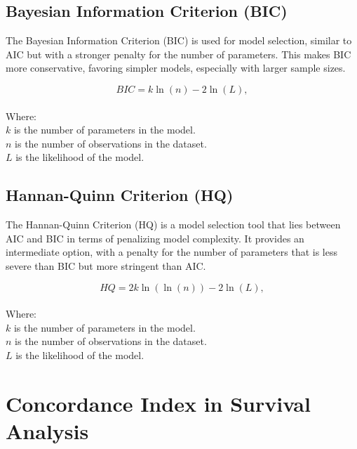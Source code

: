 \documentclass[doublespacing,12pt]{report}
\begin{document}
\subsection{Bayesian Information Criterion (BIC)}
The Bayesian Information Criterion (BIC) is used for model selection, similar to AIC but with a stronger penalty for the number of parameters. This makes BIC more conservative, favoring simpler models, especially with larger sample sizes.

\begin{equation}
BIC = k\ln(n) - 2\ln(L),
\end{equation}\\
Where:\\
\vspace{0.1in}
     \(k\) is the number of parameters in the model.\\
\vspace{0.1in}
     \(n\) is the number of observations in the dataset.\\
\vspace{0.1in}
     \(L\) is the likelihood of the model.\\


\subsection{Hannan-Quinn Criterion (HQ)}
The Hannan-Quinn Criterion (HQ) is a model selection tool that lies between AIC and BIC in terms of penalizing model complexity. It provides an intermediate option, with a penalty for the number of parameters that is less severe than BIC but more stringent than AIC.

\begin{equation}
HQ = 2k\ln(\ln(n)) - 2\ln(L),
\end{equation}\\
Where:\\
\vspace{0.1in}
     \(k\) is the number of parameters in the model.\\
\vspace{0.1in}
     \(n\) is the number of observations in the dataset.\\
\vspace{0.1in}
     \(L\) is the likelihood of the model.



\section{Concordance Index in Survival Analysis}
\end{document}
